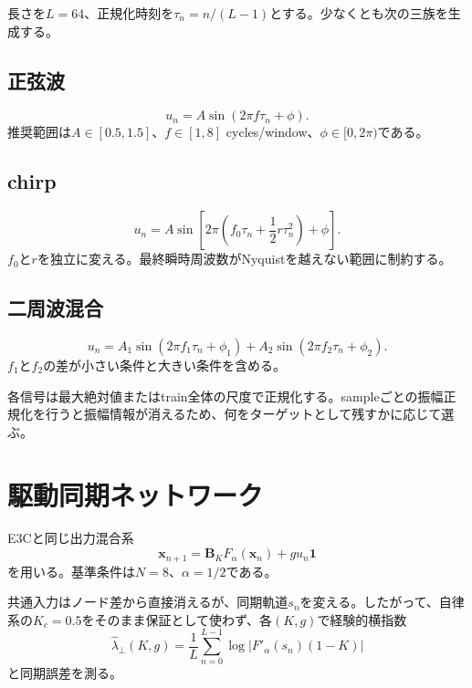 \documentclass[a4paper,11pt,oneside,openany]{ltjsbook}
\newcommand{\ones}{\bm{1}}
\newcommand{\vect}[1]{\bm{#1}}
\newcommand{\mat}[1]{\bm{#1}}
\begin{document}
長さを\(L=64\)、正規化時刻を\(\tau_n=n/(L-1)\)とする。少なくとも次の三族を生成する。

\subsection{正弦波}
\begin{equation}
  u_n=A\sin(2\pi f\tau_n+\phi).
  \label{eq:e4_sine}
\end{equation}
推奨範囲は\(A\in[0.5,1.5]\)、\(f\in[1,8]\) cycles/window、\(\phi\in[0,2\pi)\)である。

\subsection{chirp}
\begin{equation}
  u_n=A\sin\left[2\pi\left(f_0\tau_n+\frac12r\tau_n^2\right)+\phi\right].
  \label{eq:e4_chirp}
\end{equation}
\(f_0\)と\(r\)を独立に変える。最終瞬時周波数がNyquistを越えない範囲に制約する。

\subsection{二周波混合}
\begin{equation}
  u_n=A_1\sin(2\pi f_1\tau_n+\phi_1)
      +A_2\sin(2\pi f_2\tau_n+\phi_2).
  \label{eq:e4_two_tone}
\end{equation}
\(f_1\)と\(f_2\)の差が小さい条件と大きい条件を含める。

各信号は最大絶対値またはtrain全体の尺度で正規化する。sampleごとの振幅正規化を行うと振幅情報が消えるため、何をターゲットとして残すかに応じて選ぶ。

\section{駆動同期ネットワーク}

E3Cと同じ出力混合系
\begin{equation}
  \vect x_{n+1}
  =\mat B_KF_\alpha(\vect x_n)+g u_n\ones
  \label{eq:e4_driven_network}
\end{equation}
を用いる。基準条件は\(N=8\)、\(\alpha=1/2\)である。

共通入力はノード差から直接消えるが、同期軌道\(s_n\)を変える。したがって、自律系の\(K_c=0.5\)をそのまま保証として使わず、各\((K,g)\)で経験的横指数
\begin{equation}
  \widehat\lambda_\perp(K,g)
  =\frac1L\sum_{n=0}^{L-1}
    \log\left|F'_\alpha(s_n)(1-K)\right|
  \label{eq:e4_driven_transverse}
\end{equation}
と同期誤差を測る。
\end{document}

